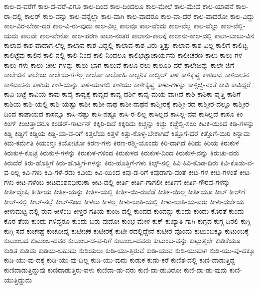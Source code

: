 {ಕಾಲ-ದ-ವರೆಗೆ
ಕಾಲ-ದ-ವರೆ-ವಿಗೂ
ಕಾಲ-ದಿಂದ
ಕಾಲ-ದಿಂದಲೂ
ಕಾಲ-ಮೇಲೆ
ಕಾಲ-ಮೇವ
ಕಾಲ-ಯಾಪನೆ
ಕಾಲ-ರಾ-ದಲ್ಲಿ
ಕಾಲರ್
ಕಾಲ-ವನ್ನು
ಕಾಲ-ವನ್ನೆಲ್ಲಾ
ಕಾಲ-ವಾಗಿ
ಕಾಲ-ವಾದರೂ
ಕಾಲ-ವಾ-ದರೆ
ಕಾಲ-ವಾದರೋ
ಕಾಲ-ವಿದ್ದು
ಕಾಲ-ವಿರ-ಬೇಕಾ-ದರೆ
ಕಾಲ-ವಿ-ರು-ವುದು
ಕಾಲ-ವಿಲ್ಲ
ಕಾಲವೂ
ಕಾಲ-ವೆಂದು
ಕಾಲ-ವೆಲ್ಲ
ಕಾಲ-ವೆಲ್ಲಾ
ಕಾಲ-ವೆಲ್ಲಿ-ಯದು
ಕಾಲವೇ
ಕಾಲ-ವೇನೋ
ಕಾಲ-ಹರಣ
ಕಾಲಾ-ನಂತರ
ಕಾಲಾನು-ಕಾಲಕ್ಕೆ
ಕಾಲಾನು-ಕಾಲ-ದಲ್ಲಿ
ಕಾಲಾ-ಬಾಬು-ವಿನ
ಕಾಲಾವ-ಕಾಶ-ವಾದಾಗ-ಲೆಲ್ಲ
ಕಾಲಾವ-ಕಾಶ-ವಿದ್ದಲ್ಲಿ
ಕಾಲಾವ-ಕಾಶ-ವಿರು-ತ್ತಿತ್ತು
ಕಾಲಾವ-ಕಾಶ-ವಿಲ್ಲ
ಕಾಲಿಗೆ
ಕಾಲಿಟ್ಟ
ಕಾಲಿಟ್ಟೆವು
ಕಾಲಿನ
ಕಾಲಿ-ನಲ್ಲಿ
ಕಾಲಿ-ನಿಂದ
ಕಾಲಿ-ನಿಂದಲೂ
ಕಾಲಿಭಟ್ಟಾಚಾರ್ಯನು
ಕಾಲೀಚರಣ
ಕಾಲು
ಕಾಲು-ಗಳ
ಕಾಲು-ಗಳು
ಕಾಲು-ಚೀಲ-ಗಳನ್ನು
ಕಾಲು-ಭಾಗ
ಕಾಲುವೆ
ಕಾಲೂ-ರಲು
ಕಾಲೂರಿ-ದರೆ
ಕಾಲೇಜನ್ನು
ಕಾಲೇ-ಜಿಗೆ
ಕಾಲೇಜಿನ
ಕಾಲೇಜು
ಕಾಲೇಜು-ಗಳೆಲ್ಲ
ಕಾಲೋ
ಕಾಲೋಹಿ
ಕಾಲ್ಪನಿಕ
ಕಾಲ್ವಿಲ್
ಕಾಳಿ
ಕಾಳಿಕೃಷ್ಣ
ಕಾಳಿದಾಸ
ಕಾಳಿದಾಸನ
ಕಾಳಿದಾಸನು
ಕಾಳಿಯ
ಕಾಳಿ-ಯನ್ನು
ಕಾಳಿ-ಯಾಗಲಿ
ಕಾಳಿಯು
ಕಾಳೀಕೃಷ್ಣ
ಕಾಳು-ಗಳನ್ನು
ಕಾಳ್ಗಿಚ್ಚಿ-ನಂತೆ
ಕಾವಿ
ಕಾವಿದ್ದರೆ
ಕಾವಿ-ಬಟ್ಟೆ
ಕಾವಿಯ
ಕಾವು
ಕಾವ್ಯ
ಕಾವ್ಯಕ್ಕೆ
ಕಾವ್ಯದ
ಕಾವ್ಯ-ದರ್ಶಿ
ಕಾವ್ಯ-ಮಯ-ವಾಗಿದೆ
ಕಾಶಿ
ಕಾಶಿಕಾ-ವೃತ್ತಿ
ಕಾಶಿಗೆ
ಕಾಶಿಯ
ಕಾಶಿ-ಯಲ್ಲಿ
ಕಾಶಿ-ಯಷ್ಟು
ಕಾಶೀ
ಕಾಶೀ-ನಾಥ
ಕಾಶೀ-ನಾಥನ
ಕಾಶ್ಮೀರಕ್ಕೆ
ಕಾಶ್ಮೀ-ರದ
ಕಾಶ್ಮೀರ-ದಲ್ಲೂ
ಕಾಶ್ಮೀರ-ದಿಂದ
ಕಾಷಾಯದ
ಕಾಸನ್ನೂ
ಕಾಸಿ-ನಷ್ಟು
ಕಾಸಿ-ನಷ್ಟೂ
ಕಾಸಿ-ರ-ಲಿಲ್ಲ
ಕಾಸಿಲ್ಲದ
ಕಾಸಿಲ್ಲ-ದವ
ಕಾಸಿಲ್ಲದೆ
ಕಾಸೂ
ಕಿಂ
ಕಿಂಗ್
ಕಿಂಚಿತ್ತಾದರೂ
ಕಿಂಡರ್‌-ಗಾರ್ಟನ್
ಕಿಕ್ಕಿರಿ-ದಿದೆ
ಕಿಕ್ಕಿರಿದು
ಕಿಚ್ಚನ್ನು
ಕಿಚ್ಚು
ಕಿಚ್ಚೆಬ್ಬಿ-ಸಲು
ಕಿಟಕಿ-ಯಿಂದ
ಕಿಡಿ-ಗಳನ್ನು
ಕಿಡ್ಡಿ
ಕಿಡ್ಡಿಗೆ
ಕಿಡ್ಡಿಯ
ಕಿಡ್ಡಿ-ಯ-ವ-ರಿಗೆ
ಕಿತ್ತಲೆಯ
ಕಿತ್ತಳೆ
ಕಿತ್ತು-ಕೊಳ್ಳ-ಬೇಕಾಗಿದೆ
ಕಿತ್ತೊಗೆ-ದರೆ
ಕಿತ್ತೊಗೆ-ಯಿರಿ
ಕಿನ್ನಾಮ
ಕಿಮ-ಕರ್ಮೆತಿ
ಕಿಯಂನ್ತಃ
ಕಿಯೋಟೋ
ಕಿರಣ-ಗಳು
ಕಿರಣ-ರಶ್ಮಿ-ಯೊಂದು
ಕಿರಿ-ದಾಗಿದೆ
ಕಿರಿದು
ಕಿರಿಯ
ಕಿರುಕುಳ
ಕಿರುಕುಳ-ಕೊಟ್ಟೆ
ಕಿರುಕುಳ-ಗಳನ್ನು
ಕಿರುಕುಳ-ಗಳಿಂದ
ಕಿರುಕುಳದ
ಕಿರುಕುಳ-ದಿಂದ
ಕಿರುಕುಳ-ವನ್ನು
ಕಿರುಚು-ವರು
ಕಿರುದೆರೆ
ಕಿರು-ಹೊತ್ತಿಗೆ
ಕಿರು-ಹೊತ್ತಿಗೆ-ಗಳನ್ನು
ಕಿರು-ಹೊತ್ತಿಗೆ-ಗಳು
ಕಿಲ್ಸ್‌-ನಲ್ಲಿ
ಕಿವಿ
ಕಿವಿ-ಕೊಡ-ದಿರು
ಕಿವಿ-ಕೊಡು-ವ-ವ-ರಿಲ್ಲ
ಕಿವಿ-ಗಳು
ಕಿವಿ-ಗಳೆ-ರಡು
ಕಿವಿಯ
ಕಿವಿ-ಯಿಂದ
ಕಿವು-ಡ-ರಿಗೆ
ಕಿವುಡಾಗು-ವಂತೆ
ಕೀಟ-ಗಳ
ಕೀಟ-ಗಳಂತೆ
ಕೀಟ-ಗಳು
ಕೀಟ-ಗಳೆಂಬ
ಕೀಟದಂಶನಭೀರುಕಾ
ಕೀಟ-ದಲ್ಲಿ
ಕೀರ್ತಿ
ಕೀರ್ತಿ-ಗಾಗಲೀ
ಕೀರ್ತಿಗೆ
ಕೀರ್ತಿ-ಗೌರವ-ಗಳನ್ನು
ಕೀರ್ತಿದ್ವೇಷಿ
ಕೀರ್ತಿಯ
ಕೀರ್ತಿ-ಯನ್ನು
ಕೀರ್ತಿ-ಯಲ್ಲಿ
ಕೀರ್ತಿ-ಯಿ-ರುವೆಡೆ
ಕೀರ್ತಿ-ಯಿಲ್ಲ
ಕೀರ್ತಿಯೂ
ಕೀಲ್
ಕೀಲ್‌ಗೆ
ಕೀಲ್‌-ನಲ್ಲಿ
ಕೀಲ್‌-ನಲ್ಲೆ
ಕೀಲ್‌-ನಿಂದ
ಕೀಳಲು
ಕೀಳಲ್ಲ
ಕೀಳು-ಜಾತಿ-ಯಲ್ಲಿ
ಕೀಳು-ಜಾತಿ-ಯ-ವರು
ಕೀಳು-ದರ್ಜೆಯ
ಕೀಳುಮಟ್ಟ-ದಲ್ಲಿ-ರುವ
ಕೀಳೆಂಬ
ಕೀಳ್ತರ-ಗತಿಯ
ಕುಂಜ-ದಲ್ಲಿ
ಕುಂದದ
ಕುಂದನ್ನು
ಕುಂದು
ಕುಂದು-ಕೊರತೆ
ಕುಂದು-ಕೊರ-ತೆಯ
ಕುಂದು-ಗಳಿದ್ದರೂ
ಕುಂದು-ಬರು-ವುದೋ
ಕುಂಭ-ಮೇಳ
ಕುಕ್
ಕುಖ್ಯಾತಿ-ಗಾಗಿ
ಕುಗ್ಗದ
ಕುಗ್ಗ-ದಿರಲಿ
ಕುಗ್ಗಿ
ಕುಗ್ಗಿ-ಸದೆ
ಕುಚೇಷ್ಟೆ
ಕುಚೋದ್ಯ
ಕುಟೀಚಕ
ಕುಟೀರಕ್ಕೆ
ಕುಟೀ-ರದಲ್ಲಿದ್ದೇನೆ
ಕುಟೀರ-ವೊಂದು
ಕುಟುಂಬಕ್ಕೂ
ಕುಟುಂಬಕ್ಕೆ
ಕುಟುಂಬದ
ಕುಟುಂಬ-ದವರ
ಕುಟುಂಬ-ದ-ವ-ರಿಗೆ
ಕುಟುಂಬ-ದವರು
ಕುಟುಂಬ-ವನ್ನು
ಕುಟ್ಟುತ್ತಲೇ
ಕುಡಿಕೆಯೂ
ಕುಡಿತ
ಕುಡಿದು
ಕುಡಿಯ-ಬಹುದು
ಕುಡಿಯಲು
ಕುಡಿ-ಯು-ತ್ತಿರುವೆ
ಕುಡಿ-ಯುವ
ಕುಡಿ-ಯುವಾಗ
ಕುಡಿ-ಯು-ವು-ದಕ್ಕೂ
ಕುಡಿ-ಯು-ವು-ದಕ್ಕೆ
ಕುಡಿ-ಯು-ವು-ದಿಲ್ಲ
ಕುಡಿ-ಯು-ವುದು
ಕುಡುಕ
ಕುಡು-ಕರೆ
ಕುಣಿತ-ದಲ್ಲಿ
ಕುಣಿ-ದಾಡುತ್ತಿದ್ದ
ಕುಣಿದಾಡುತ್ತಿದ್ದುವು
ಕುಣಿದಾಡುತ್ತಿರು-ವಳು
ಕುಣಿದಾ-ಡು-ವರು
ಕುಣಿ-ದಾ-ಡುವಿರೋ
ಕುಣಿ-ದಾ-ಡು-ವುದು
ಕುಣಿ-ಯುತ್ತಿದ್ದುದು
}
